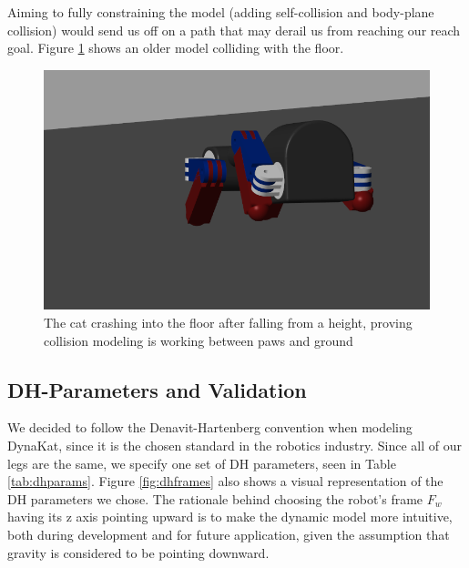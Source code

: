 Aiming to fully constraining the model (adding self-collision and body-plane collision) would send us off on a path that may derail us from reaching our reach goal. Figure \ref{fig:collision} shows an older model colliding with the floor.
\begin{figure}[thpb]
    \centering
    \includegraphics[width=\linewidth]{Figures/ContactModel.png}
    \caption{The cat crashing into the floor after falling from a height, proving collision modeling is working between paws and ground}
    \label{fig:collision}
\end{figure}

\subsection{DH-Parameters and Validation} \label{sec:dhparams}
We decided to follow the Denavit-Hartenberg convention when modeling DynaKat, since it is the chosen standard in the robotics industry. Since all of our legs are the same, we specify one set of DH parameters, seen in Table \ref{tab:dhparams}. Figure \ref{fig:dhframes} also shows a visual representation of the DH parameters we chose. The rationale behind choosing the robot's frame $F_w$ having its z axis pointing upward is to make the dynamic model more intuitive, both during development and for future application, given the assumption that gravity is considered to be pointing downward.

